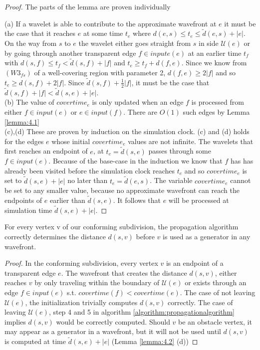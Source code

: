 \begin{proof} 
The parts of the lemma are proven individually

	(a) If a wavelet is able to contribute to the approximate wavefront at $e$
	it must be the case that it reaches $e$ at some time $t_e$ where $d(e,s) \leq
	t_e \leq \tilde{d}(e,s)+|e|$. 
	On the way from $s$ to $e$ the wavelet either goes straight from $s$ in side 
	$\mathcal{U}(e)$ or by going through another transparent edge  $f \in inpute(e)$ at an 
    earlier time $t_f$ 
	with $d(s,f) \leq t_f < \tilde{d}(s,f)+|f|$ and $t_e \geq t_f+d(f,e)$.  
	Since we know from $(W3_{fs})$ of a well-covering region with parameter 2, 	   
    $d(f,e)\geq 2|f|$	
	and so $t_e \geq d(s,f)+2|f|$. Since $\tilde{d}(s,f)+\frac{1}{2}|f|$, it
	must be the case that $\tilde{d}(s,f)+|f|<\tilde{d}(s,e)+|e|$. \\

	(b) The value of $covertime_e$ is only updated when an edge $f$ is processed
	from either $f \in input(e)$ or $e \in input(f)$. There are $O(1)$ such edges by
	Lemma \ref{lemma:4.1} \\

	(c),(d) These are proven by induction on the simulation clock. (c) and
	(d) holds for the edges $e$ whose initial $covertime_e$ values are not
	infinite. The wavelets that first reaches an endpoint of $e$, at
	$t_e=\tilde{d}(s,e)$ passes through some $f \in input(e)$. Because of the
	base-case in the induction we know that $f$ has has already been visited before the 
    simulation clock
	reaches $t_e$ and so $covertime_e$ is set to $\tilde{d}(s,e)+|e|$ no later
	than $t_e=\tilde{d}(e,s)$. The variable $covertime_e$ cannot be set to any
	smaller value, because no approximate wavefront can reach the endpoints of
	$e$ earlier than $\tilde{d}(s,e)$. It follows that $e$ will be processed at
	simulation time $\tilde{d}(s,e)+|e|$.
\end{proof}

\begin{Lemma}
	For every vertex v of our conforming subdivision, the propagation algorithm
	correctly determines the distance $d(s,v)$ before $v$ is used as a generator in
	any wavefront.	
\end{Lemma}

\begin{proof}
	In the conforming subdivision, every vertex $v$ is an endpoint of a transparent edge 
    $e$. The wavefront that creates the distance $d(s,v)$, either reaches $v$ by only 
    traveling within the boundary of $\mathcal{U}(e)$ or exists through an edge $f \in 
    input(e)$ s.t. $covertime(f) < covertime(e)$. The case of not leaving $\mathcal{U}(e)$, 
    the initialization trivially computes $d(s,v)$ correctly. The case of leaving 
    $\mathcal{U}(e)$, step 4 and 5 in algorithm \ref{algorithm:propagationalgorithm} 
    implies $d(s,v)$ would be correctly computed. Should $v$ be an obstacle vertex, it may 
    appear as a generator in a wavefront, but it will not be used until $d(s,v)$ is 
    computed at time $\tilde{d}(s,e)+|e|$ (Lemma \ref{lemma:4.2} (d))
\end{proof}

